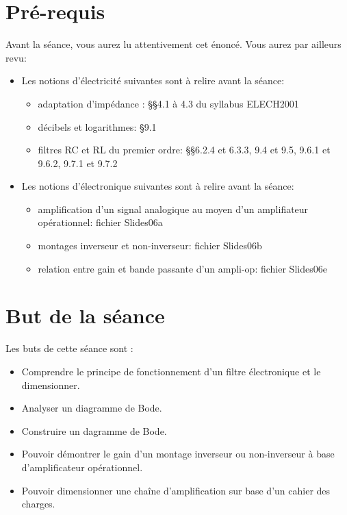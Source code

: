 \section*{Pré-requis}
Avant la séance, vous aurez lu attentivement cet énoncé. Vous aurez par ailleurs revu:\\
\begin{itemize}
\item Les notions d’électricité suivantes sont à relire avant la séance:
	\begin{itemize}
    \item adaptation d’impédance : §§4.1 à 4.3 du syllabus ELECH2001
	\item décibels et logarithmes: §9.1
	\item filtres RC et RL du premier ordre: §§6.2.4 et 6.3.3, 9.4 et 9.5, 9.6.1 et 9.6.2, 9.7.1 et 9.7.2
	\end{itemize}

\item Les notions d’électronique suivantes sont à relire avant la séance:
	\begin{itemize}
    \item amplification d’un signal analogique au moyen d’un amplifiateur opérationnel: fichier Slides06a
	\item montages inverseur et non-inverseur: fichier Slides06b
	\item relation entre gain et bande passante d’un ampli-op: fichier Slides06e
    \end{itemize}
\end{itemize}

\section*{But de la séance}
Les buts de cette séance sont :\\
\begin{itemize}
	\item Comprendre le principe de fonctionnement d'un filtre électronique et le dimensionner.
	\item Analyser un diagramme de Bode.
	\item Construire un dagramme de Bode.
	\item Pouvoir démontrer le gain d'un montage inverseur ou non-inverseur à base d'amplificateur opérationnel.
	\item Pouvoir dimensionner une chaîne d'amplification sur base d'un cahier des charges.
\end{itemize}
